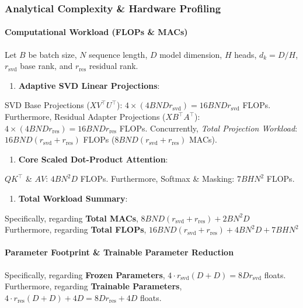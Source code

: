 \subsubsection*{Analytical Complexity \& Hardware Profiling}

\paragraph{Computational Workload (FLOPs \& MACs)}
Let $B$ be batch size, $N$ sequence length, $D$ model dimension, $H$ heads, $d_k = D/H$, $r_{\text{svd}}$ base rank, and $r_{\text{res}}$ residual rank.

\begin{enumerate}
\item \textbf{Adaptive SVD Linear Projections}:
\end{enumerate}
SVD Base Projections ($X V^\top U^\top$): $4 \times (4 B N D r_{\text{svd}}) = 16 B N D r_{\text{svd}}$ FLOPs. Furthermore, Residual Adapter Projections ($X B^\top A^\top$): $4 \times (4 B N D r_{\text{res}}) = 16 B N D r_{\text{res}}$ FLOPs. Concurrently, \textit{Total Projection Workload}: $16 B N D (r_{\text{svd}} + r_{\text{res}})$ FLOPs ($8 B N D (r_{\text{svd}} + r_{\text{res}})$ MACs).


\begin{enumerate}
\item \textbf{Core Scaled Dot-Product Attention}:
\end{enumerate}
$Q K^\top$ \& $A V$: $4 B N^2 D$ FLOPs. Furthermore, Softmax \& Masking: $7 B H N^2$ FLOPs.


\begin{enumerate}
\item \textbf{Total Workload Summary}:
\end{enumerate}
Specifically, regarding \textbf{Total MACs}, $8 B N D (r_{\text{svd}} + r_{\text{res}}) + 2 B N^2 D$ Furthermore, regarding \textbf{Total FLOPs}, $16 B N D (r_{\text{svd}} + r_{\text{res}}) + 4 B N^2 D + 7 B H N^2$


\paragraph{Parameter Footprint \& Trainable Parameter Reduction}
Specifically, regarding \textbf{Frozen Parameters}, $4 \cdot r_{\text{svd}}(D + D) = 8 D r_{\text{svd}}$ floats. Furthermore, regarding \textbf{Trainable Parameters}, $4 \cdot r_{\text{res}}(D + D) + 4 D = 8 D r_{\text{res}} + 4 D$ floats.

